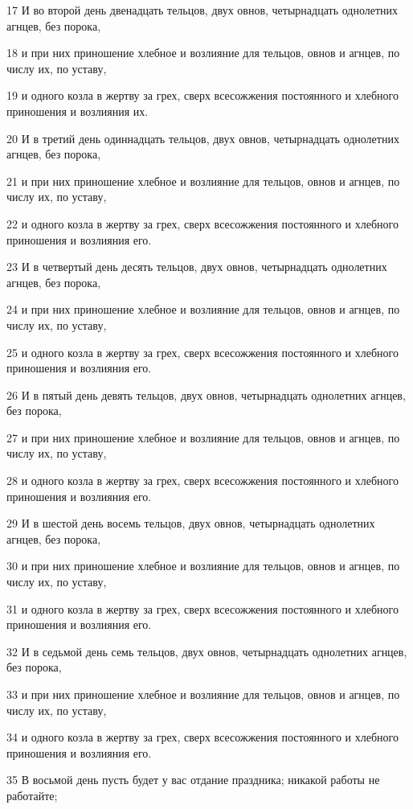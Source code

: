 \par 17 И во второй день двенадцать тельцов, двух овнов, четырнадцать однолетних агнцев, без порока,
\par 18 и при них приношение хлебное и возлияние для тельцов, овнов и агнцев, по числу их, по уставу,
\par 19 и одного козла в жертву за грех, сверх всесожжения постоянного и хлебного приношения и возлияния их.
\par 20 И в третий день одиннадцать тельцов, двух овнов, четырнадцать однолетних агнцев, без порока,
\par 21 и при них приношение хлебное и возлияние для тельцов, овнов и агнцев, по числу их, по уставу,
\par 22 и одного козла в жертву за грех, сверх всесожжения постоянного и хлебного приношения и возлияния его.
\par 23 И в четвертый день десять тельцов, двух овнов, четырнадцать однолетних агнцев, без порока,
\par 24 и при них приношение хлебное и возлияние для тельцов, овнов и агнцев, по числу их, по уставу,
\par 25 и одного козла в жертву за грех, сверх всесожжения постоянного и хлебного приношения и возлияния его.
\par 26 И в пятый день девять тельцов, двух овнов, четырнадцать однолетних агнцев, без порока,
\par 27 и при них приношение хлебное и возлияние для тельцов, овнов и агнцев, по числу их, по уставу,
\par 28 и одного козла в жертву за грех, сверх всесожжения постоянного и хлебного приношения и возлияния его.
\par 29 И в шестой день восемь тельцов, двух овнов, четырнадцать однолетних агнцев, без порока,
\par 30 и при них приношение хлебное и возлияние для тельцов, овнов и агнцев, по числу их, по уставу,
\par 31 и одного козла в жертву за грех, сверх всесожжения постоянного и хлебного приношения и возлияния его.
\par 32 И в седьмой день семь тельцов, двух овнов, четырнадцать однолетних агнцев, без порока,
\par 33 и при них приношение хлебное и возлияние для тельцов, овнов и агнцев, по числу их, по уставу,
\par 34 и одного козла в жертву за грех, сверх всесожжения постоянного и хлебного приношения и возлияния его.
\par 35 В восьмой день пусть будет у вас отдание праздника; никакой работы не работайте;
